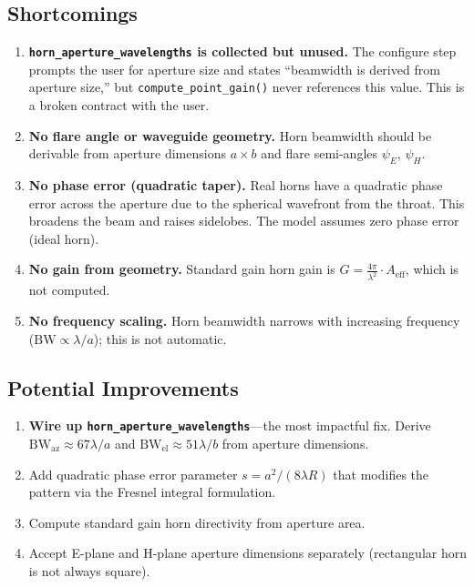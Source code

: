 \documentclass[11pt,a4paper]{article}
\begin{document}
\subsection{Shortcomings}

\begin{enumerate}[nosep]
    \item \textbf{\texttt{horn\_aperture\_wavelengths} is collected but unused.} The configure step prompts the user for aperture size and states ``beamwidth is derived from aperture size,'' but \texttt{compute\_point\_gain()} never references this value. This is a broken contract with the user.
    \item \textbf{No flare angle or waveguide geometry.} Horn beamwidth should be derivable from aperture dimensions $a \times b$ and flare semi-angles $\psi_E$, $\psi_H$.
    \item \textbf{No phase error (quadratic taper).} Real horns have a quadratic phase error across the aperture due to the spherical wavefront from the throat. This broadens the beam and raises sidelobes. The model assumes zero phase error (ideal horn).
    \item \textbf{No gain from geometry.} Standard gain horn gain is $G = \frac{4\pi}{\lambda^2} \cdot A_\text{eff}$, which is not computed.
    \item \textbf{No frequency scaling.} Horn beamwidth narrows with increasing frequency ($\text{BW} \propto \lambda / a$); this is not automatic.
\end{enumerate}

\subsection{Potential Improvements}

\begin{enumerate}[nosep]
    \item \textbf{Wire up \texttt{horn\_aperture\_wavelengths}}---the most impactful fix. Derive $\text{BW}_\text{az} \approx 67\lambda/a$ and $\text{BW}_\text{el} \approx 51\lambda/b$ from aperture dimensions.
    \item Add quadratic phase error parameter $s = a^2 / (8\lambda R)$ that modifies the pattern via the Fresnel integral formulation.
    \item Compute standard gain horn directivity from aperture area.
    \item Accept E-plane and H-plane aperture dimensions separately (rectangular horn is not always square).
\end{enumerate}
\end{document}
